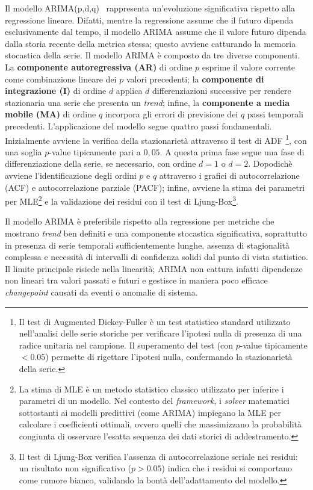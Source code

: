 Il modello \gls{ARIMA}(p,d,q)~\cite{box2016} 
rappresenta un'evoluzione significativa rispetto alla regressione lineare. Difatti, mentre la
regressione assume che il futuro dipenda esclusivamente dal tempo, il modello ARIMA assume che il
valore futuro dipenda dalla storia recente della metrica stessa; questo avviene catturando la
memoria stocastica della serie. Il modello ARIMA è composto da tre diverse componenti. La
\textbf{componente autoregressiva (AR)} di ordine $p$ esprime il valore corrente come combinazione
lineare dei $p$ valori precedenti; la \textbf{componente di integrazione (I)} di ordine $d$ applica
$d$ differenziazioni successive per rendere stazionaria una serie che presenta un \textit{trend};
infine, la \textbf{componente a media mobile (MA)} di ordine $q$ incorpora gli errori di previsione
dei $q$ passi temporali precedenti. L'applicazione del modello segue quattro passi fondamentali.
Inizialmente avviene la verifica della stazionarietà attraverso il test di \gls{ADF} 
\footnote{Il test di Augmented Dickey-Fuller è un test statistico
standard utilizzato nell'analisi delle serie storiche per verificare l'ipotesi nulla di presenza
di una radice unitaria nel campione. Il superamento del test (con $p$-value tipicamente $< 0.05$)
permette di rigettare l'ipotesi nulla, confermando la stazionarietà della serie.}, con una soglia
$p$-value tipicamente pari a $0{,}05$. A questa prima fase segue una fase di differenziazione della
serie, se necessario, con ordine $d = 1$ o $d = 2$. Dopodichè avviene l'identificazione degli
ordini $p$ e $q$ attraverso i grafici di autocorrelazione (\gls{ACF}) e autocorrelazione parziale
(\gls{PACF}); infine, avviene la stima dei parametri per \gls{MLE}\footnote{La stima di \gls{MLE} è un metodo statistico classico utilizzato 
per inferire i parametri di un modello. Nel contesto del \textit{framework}, i \textit{solver} matematici 
sottostanti ai modelli predittivi (come ARIMA) impiegano la \gls{MLE} per calcolare i coefficienti ottimali, 
ovvero quelli che massimizzano la probabilità congiunta di osservare l'esatta sequenza dei dati storici di addestramento.}
e la validazione dei residui con il test di
Ljung-Box\footnote{Il test di Ljung-Box verifica l'assenza di autocorrelazione 
seriale nei residui: un risultato non significativo ($p > 0.05$) indica 
che i residui si comportano come rumore bianco, validando la bontà 
dell'adattamento del modello.}.

Il modello ARIMA è preferibile rispetto alla regressione per metriche che mostrano \textit{trend}
ben definiti e una componente stocastica significativa, soprattutto in presenza di serie temporali
sufficientemente lunghe, assenza di stagionalità complessa e necessità di intervalli di confidenza
solidi dal punto di vista statistico. Il limite principale risiede nella linearità; ARIMA non
cattura infatti dipendenze non lineari tra valori passati e futuri e gestisce in maniera poco
efficace \textit{changepoint} causati da eventi o anomalie di sistema.

